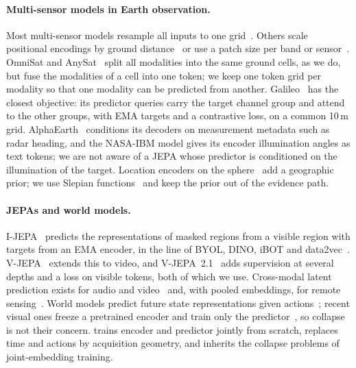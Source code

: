 \paragraph{Multi-sensor models in Earth observation.} Most multi-sensor models resample all inputs to one grid~\cite{fuller2023croma,xiong2024neural,jakubik2025terramind,tseng2025galileo}. Others scale positional encodings by ground distance~\cite{reed2023scale,irvin2023usat,forgaard2026thor} or use a patch size per band or sensor~\cite{irvin2023usat,wang2025towards,labatie2026maestro}. OmniSat and AnySat~\cite{astruc2024omnisat,astruc2025anysat} split all modalities into the same ground cells, as we do, but fuse the modalities of a cell into one token; we keep one token grid per modality so that one modality can be predicted from another. Galileo~\cite{tseng2025galileo} has the closest objective: its predictor queries carry the target channel group and attend to the other groups, with EMA targets and a contrastive loss, on a common 10\,m grid. AlphaEarth~\cite{brown2025alphaearth} conditions its decoders on measurement metadata such as radar heading, and the NASA-IBM model gives its encoder illumination angles as text tokens; we are not aware of a JEPA whose predictor is conditioned on the illumination of the target. Location encoders on the sphere~\cite{mai2020multi,klemmer2025satclip,russwurm2024geographic} add a geographic prior; we use Slepian functions~\cite{simons2006spatiospectral,rao2026localized} and keep the prior out of the evidence path.

\paragraph{JEPAs and world models.} I-JEPA~\cite{assran2023self} predicts the representations of masked regions from a visible region with targets from an EMA encoder, in the line of BYOL, DINO, iBOT and data2vec~\cite{grill2020bootstrap,caron2021emerging,zhou2022ibot,baevski2022data2vec}. V-JEPA~\cite{bardes2024revisiting,assran2025vjepa} extends this to video, and V-JEPA~2.1~\cite{murlabadia2026vjepa} adds supervision at several depths and a loss on visible tokens, both of which we use. Cross-modal latent prediction exists for audio and video~\cite{haliassos2023jointly} and, with pooled embeddings, for remote sensing~\cite{choudhury2026xjepa,hossain2026crjepa}. World models predict future state representations given actions~\cite{ha2018recurrent,lecun2022path}; recent visual ones freeze a pretrained encoder and train only the predictor~\cite{zhou2024dinowm,bar2025navigation,assran2025vjepa}, so collapse is not their concern. \method trains encoder and predictor jointly from scratch, replaces time and actions by acquisition geometry, and inherits the collapse problems of joint-embedding training.

